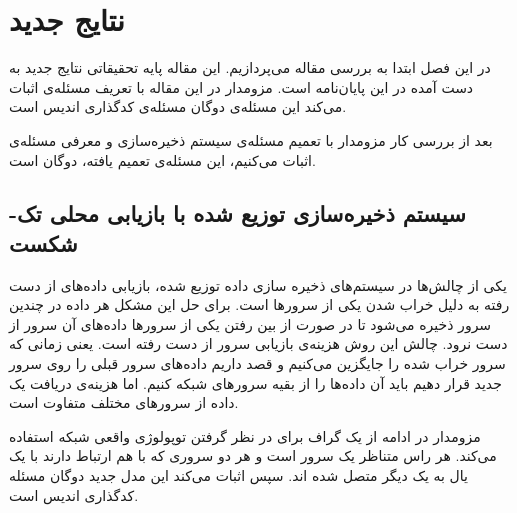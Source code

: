 \chapter{نتایج جدید}
\label{chapter:results}
در این فصل ابتدا به بررسی مقاله
\cite{arya}
 می‌پردازیم. این مقاله پایه تحقیقاتی نتایج جدید به دست آمده در این پایان‌نامه است. مزومدار در این مقاله با تعریف مسئله‌ی
اثبات می‌کند این مسئله‌ی دوگان مسئله‌ی کدگذاری اندیس است.

بعد از بررسی کار مزومدار با تعمیم مسئله‌ی سیستم ذخیره‌سازی و معرفی مسئله‌ی
 اثبات می‌کنیم، این مسئله‌ی تعمیم یافته، دوگان 
 \lpicod
  است.
\newpage

\section{
سیستم ذخیره‌سازی توزیع شده با بازیابی محلی تک-شکست \SFRDSS
}
یکی از چالش‌ها در سیستم‌های ذخیره سازی داده توزیع شده، بازیابی داده‌های از دست رفته به دلیل خراب شدن یکی از سرورها است. 
برای حل این مشکل هر داده در چندین سرور ذخیره می‌شود تا در صورت از بین رفتن یکی از سرورها داده‌های آن سرور از دست نرود. چالش این روش هزینه‌ی بازیابی سرور از دست رفته است. یعنی زمانی که سرور خراب شده را جایگزین می‌کنیم و قصد داریم داده‌های سرور قبلی را روی سرور جدید قرار دهیم باید آن داده‌ها را از بقیه سرورهای شبکه 
کنیم. اما هزینه‌ی دریافت یک داده از سرورهای مختلف متفاوت است.

 
 مزومدار در ادامه از یک گراف برای در نظر گرفتن توپولوژی واقعی شبکه استفاده می‌کند. هر راس متناظر یک سرور است و هر دو سروری که با هم ارتباط دارند با یک یال به یک دیگر متصل شده اند. سپس اثبات می‌کند این مدل جدید دوگان مسئله کدگذاری اندیس است.
 
